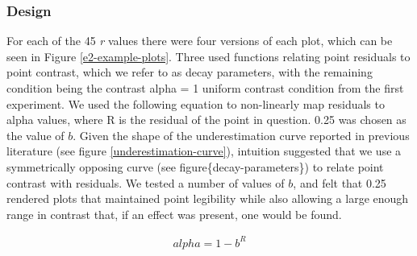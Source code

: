 \documentclass[preprint, 3p,
authoryear]{elsarticle} %
\begin{document}
\hypertarget{design-1}{%
\subsubsection{Design}\label{design-1}}

For each of the 45 \emph{r} values there were four versions of each
plot, which can be seen in Figure \ref{e2-example-plots}. Three used
functions relating point residuals to point contrast, which we refer to
as decay parameters, with the remaining condition being the contrast
alpha = 1 uniform contrast condition from the first experiment. We used
the following equation to non-linearly map residuals to alpha values,
where R is the residual of the point in question. 0.25 was chosen as the
value of \(b\). Given the shape of the underestimation curve reported in
previous literature (see figure \ref{underestimation-curve}), intuition
suggested that we use a symmetrically opposing curve (see
figure\{decay-parameters\}) to relate point contrast with residuals. We
tested a number of values of \(b\), and felt that 0.25 rendered plots
that maintained point legibility while also allowing a large enough
range in contrast that, if an effect was present, one would be found.

\begin{align}
  alpha = 1 - b^R
\end{align}
\end{document}

